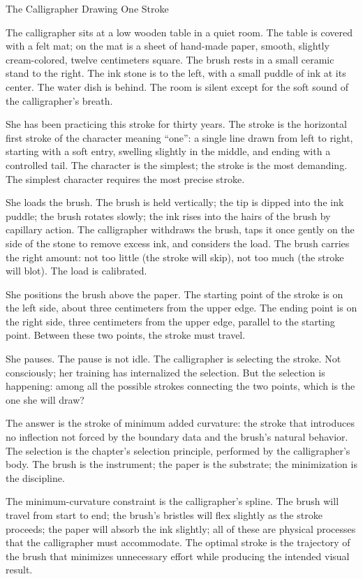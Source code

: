 \begin{coda}{The Calligrapher Drawing One Stroke}

The calligrapher sits at a low wooden table in a quiet room. The
table is covered with a felt mat; on the mat is a sheet of
hand-made paper, smooth, slightly cream-colored, twelve centimeters
square. The brush rests in a small ceramic stand to the right.
The ink stone is to the left, with a small puddle of ink at its
center. The water dish is behind. The room is silent except for the
soft sound of the calligrapher's breath.

She has been practicing this stroke for thirty years. The stroke is
the horizontal first stroke of the character meaning ``one'': a
single line drawn from left to right, starting with a soft entry,
swelling slightly in the middle, and ending with a controlled tail.
The character is the simplest; the stroke is the most demanding.
The simplest character requires the most precise stroke.

She loads the brush. The brush is held vertically; the tip is dipped
into the ink puddle; the brush rotates slowly; the ink rises into
the hairs of the brush by capillary action. The calligrapher
withdraws the brush, taps it once gently on the side of the stone
to remove excess ink, and considers the load. The brush carries the
right amount: not too little (the stroke will skip), not too much
(the stroke will blot). The load is calibrated.

She positions the brush above the paper. The starting point of the
stroke is on the left side, about three centimeters from the
upper edge. The ending point is on the right side, three
centimeters from the upper edge, parallel to the starting point.
Between these two points, the stroke must travel.

She pauses. The pause is not idle. The calligrapher is selecting
the stroke. Not consciously; her training has internalized the
selection. But the selection is happening: among all the possible
strokes connecting the two points, which is the one she will draw?

The answer is the stroke of minimum added curvature: the stroke
that introduces no inflection not forced by the boundary data and
the brush's natural behavior. The selection is the chapter's
selection principle, performed by the calligrapher's body. The
brush is the instrument; the paper is the substrate; the
minimization is the discipline.

The minimum-curvature constraint is the calligrapher's spline. The
brush will travel from start to end; the brush's bristles will
flex slightly as the stroke proceeds; the paper will absorb the
ink slightly; all of these are physical processes that the
calligrapher must accommodate. The optimal stroke is the
trajectory of the brush that minimizes unnecessary effort while
producing the intended visual result.


\end{coda}
